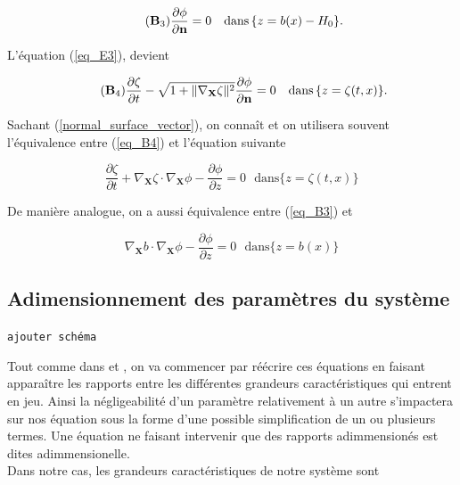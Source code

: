 \documentclass[12pt,a4paper]{article}
\numberwithin{equation}{section}
\begin{document}
\begin{equation} \tag{$\textbf{B}_3$} \label{eq_B3}
    \frac{\partial \phi}{\partial \textbf{n}} = 0 ~~~ \text{dans}\,\{z = b(x)-H_0\} .
\end{equation}

L'équation (\ref{eq_E3}), devient

\begin{equation} \tag{$\textbf{B}_4$} \label{eq_B4}
\frac{\partial \zeta}{\partial t}  - \sqrt{1+ \| \nabla_\textbf{X}\zeta\|^2}\frac{\partial \phi}{\partial\textbf{n}} = 0~~~\text{dans}\,\{z = \zeta(t,x)\} .
\end{equation}

Sachant (\ref{normal_surface_vector}), on connaît et on utilisera souvent l'équivalence entre (\ref{eq_B4}) et l'équation suivante


\begin{equation} \label{eq_B4_bis}
    \frac{\partial \zeta}{\partial t}  + \nabla_\textbf{X}\zeta\cdot\nabla_\textbf{X}\phi - \frac{\partial\phi}{\partial z} = 0 ~~~\text{dans}\{z = \zeta(t,x)\} 
\end{equation}

De manière analogue, on a aussi équivalence entre (\ref{eq_B3}) et 

\begin{equation} \label{eq_B3_bis}
    \nabla_\textbf{X}b\cdot\nabla_\textbf{X}\phi - \frac{\partial\phi}{\partial z} = 0 ~~~\text{dans}\{z = b(x)\} 
\end{equation}


\subsection{Adimensionnement des paramètres du système}

\begin{center}
    \texttt{ajouter schéma}
\end{center}

Tout comme dans \cite{MT} et  \cite{Lannes}, on va commencer par réécrire ces équations en faisant apparaître les rapports entre les différentes grandeurs caractéristiques qui entrent en jeu. Ainsi la négligeabilité d'un paramètre relativement à un autre s'impactera sur nos équation sous la forme d'une possible simplification de un ou plusieurs termes. Une équation ne faisant intervenir que des rapports adimmensionés est dites adimmensionelle. 
\\

Dans notre cas, les grandeurs caractéristiques de notre système sont
\end{document}
